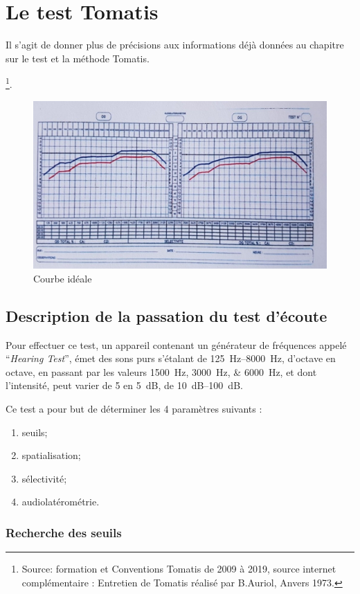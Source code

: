 \chapter{Le test Tomatis}

Il s'agit de donner plus de précisions aux informations déjà données
au chapitre sur le test et la méthode Tomatis.

 \footnote{Source: formation et
    Conventions Tomatis de 2009 à 2019, source internet complémentaire  : 
  	Entretien de Tomatis réalisé par B.Auriol, Anvers 1973.}.


\begin{figure}
	\centering
	\includegraphics[width=0.7\linewidth]{images/courbeideale.jpg}
	\caption{Courbe idéale}
	\label{fig:courbeideale}
\end{figure}




\section{Description de la passation du test d'écoute}
\label{passation}

Pour effectuer ce test, un appareil contenant un générateur de fréquences appelé ``\emph{Hearing Test}'', émet des sons purs s'étalant de \SIrange{125}{8000}{\Hz}, d'octave en octave, en passant par les valeurs
\SIlist{1500;3000;6000}{\Hz}, et dont l'intensité, peut varier de 5 en \SI{5}{\dB}, de \SIrange{10}{100}{\dB}. 

Ce test a pour but de déterminer les 4 paramètres suivants : 
\begin{enumerate}
\item seuils;
\item spatialisation;
\item sélectivité;
\item audiolatérométrie.
\end{enumerate}

\subsection{Recherche des seuils}

